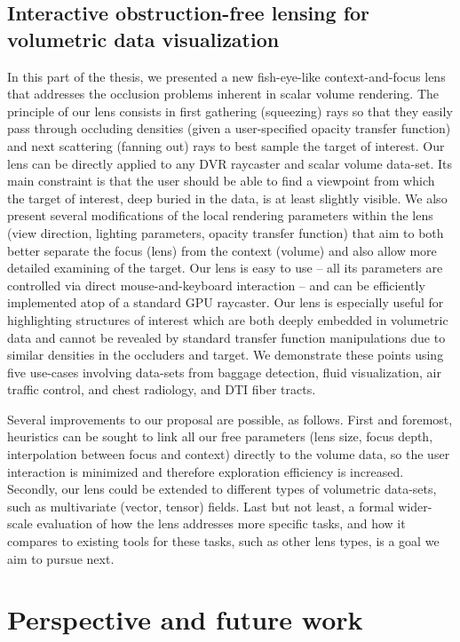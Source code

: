 \subsection{Interactive obstruction-free lensing for volumetric data visualization }
In this part of the thesis, we presented a new fish-eye-like context-and-focus lens that addresses the occlusion problems inherent in scalar volume rendering. The principle of our lens consists in first gathering (squeezing) rays so that they easily pass through occluding densities (given a user-specified opacity transfer function) and next scattering (fanning out) rays to best sample the target of interest. Our lens can be directly applied to any DVR raycaster and scalar volume data-set. Its main constraint is that the user should be able to find a viewpoint from which the target of interest, deep buried in the data, is at least slightly visible. We also present several modifications of the local rendering parameters within the lens (view direction, lighting parameters, opacity transfer function) that aim to both better separate the focus (lens) from the context (volume) and also allow more detailed examining of the target. Our lens is easy to use -- all its parameters are controlled via direct mouse-and-keyboard interaction -- and can be efficiently implemented atop of a standard GPU raycaster. Our lens is especially useful for highlighting structures of interest which are both deeply embedded in volumetric data and cannot be revealed by standard transfer function manipulations due to similar densities in the occluders and target. We demonstrate these points using five use-cases involving data-sets from baggage detection, fluid visualization, air traffic control, and chest radiology, and DTI fiber tracts.

Several improvements to our proposal are possible, as follows. First and foremost, heuristics can be sought to link all our free parameters (lens size, focus depth, interpolation between focus and context) directly to the volume data, so the user interaction is minimized and therefore exploration efficiency is increased. Secondly, our lens could be extended to different types of volumetric data-sets, such as multivariate (vector, tensor) fields. Last but not least, a formal wider-scale evaluation of how the lens addresses more specific tasks, and how it compares to existing tools for these tasks, such as other lens types, is a goal we aim to pursue next.

\section{Perspective and future work}

